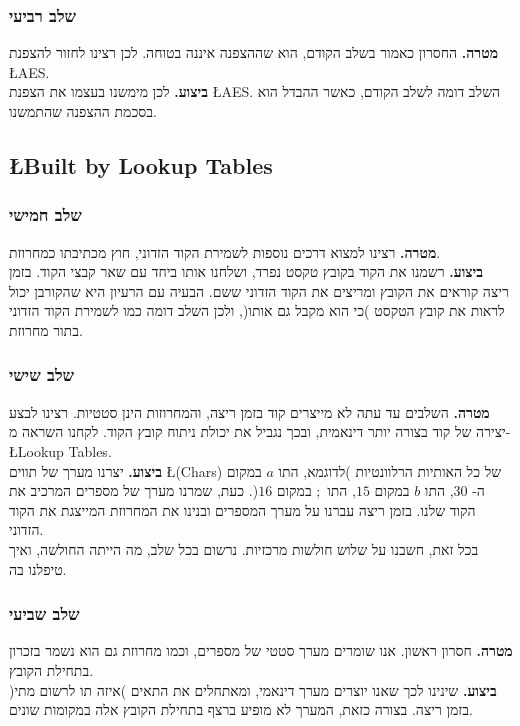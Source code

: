 \documentclass{article}
\newcommand{\goal}{\textbf{מטרה. }}
\newcommand{\action}{\textbf{ביצוע. }}
\begin{document}
			\subsubsection{שלב רביעי}
				\goal
				החסרון כאמור בשלב הקודם, הוא שההצפנה איננה בטוחה.  
				לכן רצינו לחזור להצפנת 
				\L{AES}. \\
				\action
				לכן מימשנו בעצמו את הצפנת 
				\L{AES}. 
				השלב דומה לשלב הקודם, כאשר ההבדל הוא בסכמת ההצפנה שהתמשנו. 
			
			\subsection*{\L{Built by Lookup Tables}}
			\subsubsection{שלב חמישי}
			\goal 
			רצינו למצוא דרכים נוספות לשמירת הקוד הזדוני, חוץ מכתיבתו כמחרוזת. \\
			\action 
			רשמנו את הקוד בקובץ טקסט נפרד, ושלחנו אותו ביחד עם שאר קבצי הקוד. 
			בזמן ריצה קוראים את הקובץ ומריצים את הקוד הזדוני ששם. 
			הבעיה עם הרעיון היא שהקורבן יכול לראות את קובץ הטקסט )כי הוא מקבל גם אותו(, ולכן השלב דומה כמו לשמירת הקוד הזדוני בתור מחרוזת. 
			\subsubsection{שלב שישי} 
			\goal 
			השלבים עד עתה לא מייצרים קוד בזמן ריצה, והמחרוזות הינן סטטיות. 
			רצינו לבצע יצירה של קוד בצורה יותר דינאמית, ובכך נגביל את יכולת ניתוח קובץ הקוד. לקחנו השראה מ- 
			\L{Lookup Tables}. \\
			\action
			יצרנו מערך של תווים 
			\L{(Chars)} 
			של כל האותיות הרלוונטיות 
			)לדוגמא, התו $a$ במקום ה- $30$, התו $b$ במקום $15$, התו $;$ במקום $16$(. 
			כעת, שמרנו מערך של מספרים המרכיב את הקוד שלנו. 
			בזמן ריצה עברנו על מערך המספרים ובנינו את המחרוזת המייצגת את הקוד הזדוני. \\
			
			\noindent
			בכל זאת, חשבנו על שלוש חולשות מרכזיות. 
			נרשום בכל שלב, מה הייתה החולשה, ואיך טיפלנו בה. 
			\subsubsection{שלב שביעי}
			\goal 		
			חסרון ראשון. אנו שומרים מערך סטטי של מספרים, וכמו מחרוזת גם הוא נשמר בזכרון בתחילת הקובץ. \\
			\action
			שינינו לכך שאנו יוצרים מערך דינאמי, ומאתחלים את התאים )איזה תו לרשום מתי( בזמן ריצה. 
			בצורה כזאת, המערך לא מופיע ברצף בתחילת הקובץ אלה במקומות שונים. 
\end{document}
